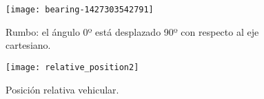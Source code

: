 \begin{figure}[H]
	\begin{minipage}{.5\textwidth}
		\begin{center}
			\texttt{[image: bearing-1427303542791]}
			\caption{Rumbo: el ángulo 0º está desplazado 90º con respecto al eje cartesiano.}
			\label{figure:Bearing}
		\end{center}
	\end{minipage}
	\begin{minipage}{.5\textwidth}
		\begin{center}
			\texttt{[image: relative\_position2]}
			\caption{Posición relativa vehicular.}
			\label{figure:VRP}
		\end{center}
	\end{minipage}
\end{figure}
